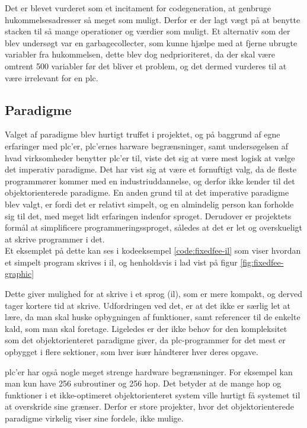 \noindent Det er blevet vurderet som et incitament for codegeneration, at genbruge hukommelsesadresser så meget som muligt. Derfor er der lagt vægt på at benytte stacken til så mange operationer og værdier som muligt.
Et alternativ som der blev undersøgt var en garbagecollecter, som kunne hjælpe med at fjerne ubrugte variabler fra hukommelsen, dette blev dog nedprioriteret, da der skal være omtrent 500 variabler før det bliver et problem, og det dermed vurderes til at være irrelevant for en \gls{plc}.

\subsection*{Paradigme}
Valget af paradigme blev hurtigt truffet i projektet, og på baggrund af egne erfaringer med \gls{plc}'er, \gls{plc}'ernes harware begrænsninger, samt undersøgelsen af hvad virksomheder benytter \gls{plc}'er til, viste det sig at være mest logisk at vælge det imperativ paradigme.
Det har vist sig at være et fornuftigt valg, da de fleste programmører kommer med en industriuddannelse, og derfor ikke kender til det objektorienterede paradigme.
En anden grund til at det imperative paradigme blev valgt, er fordi det er relativt simpelt, og en almindelig person kan forholde sig til det, med meget lidt erfaringen indenfor sproget. 
Derudover er projektets formål at simplificere programmeringssproget, således at det er let og overskueligt at skrive programmer i det.\\

\noindent Et eksemplet på dette kan ses i kodeeksempel \ref{code:fixedfee-il} som viser hvordan et simpelt program skrives i \gls{il}, og henholdsvis i \gls{lad} vist på figur \ref{fig:fixedfee-graphic}

Dette giver mulighed for at skrive i et sprog (\gls{il}), som er mere kompakt, og derved tager kortere tid at skrive. Udfordringen ved det, er at det ikke er særlig let at lære, da man skal huske opbygningen af funktioner, samt referencer til de enkelte kald, som man skal foretage.
Ligeledes er der ikke behov for den kompleksitet som det objektorienteret paradigme giver, da \gls{plc}-programmer for det mest er opbygget i flere sektioner, som hver især håndterer hver deres opgave.

\Gls{plc}'er har også nogle meget strenge hardware begrænsninger. For eksempel kan man kun have 256 subroutiner og 256 hop. Det betyder at de mange hop og funktioner i et ikke-optimeret objektorienteret system ville hurtigt få systemet til at overskride sine grænser. Derfor er store projekter, hvor det objektorienterede paradigme virkelig viser sine fordele, ikke mulige.

